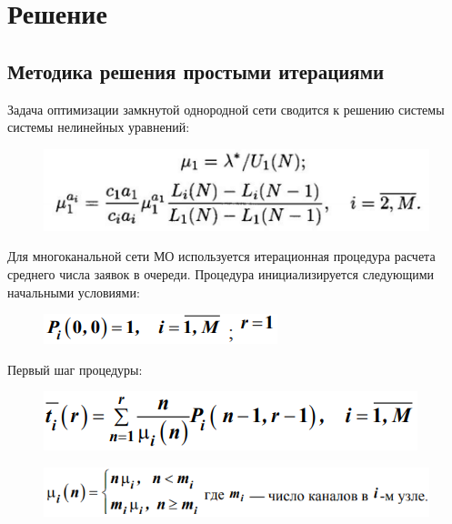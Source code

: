 \section{Решение}

\subsection{Методика решения простыми итерациями}

Задача оптимизации замкнутой однородной сети сводится к решению системы системы нелинейных уравнений:

\begin{figure}[h!]
	\centering
	\includegraphics[scale = 0.79]{images/p3_4_r.png}
	\label{image:p3_4r}
\end{figure}

Для многоканальной сети МО используется итерационная процедура расчета среднего числа заявок в очереди. Процедура инициализируется следующими начальными условиями:

\begin{figure}[h!]
	\centering
	\includegraphics[scale = 0.69]{images/p3_4_0.png}
	\label{image:p3_40}
\end{figure}

Первый шаг процедуры:

\begin{figure}[h!]
	\centering
	\includegraphics[scale = 0.69]{images/p3_4_1.png}
	\label{image:p3_41}
\end{figure}

\begin{figure}[h!]
	\centering
	\includegraphics[scale = 0.69]{images/p3_4_m.png}
	\label{image:p3_4m}
\end{figure}

